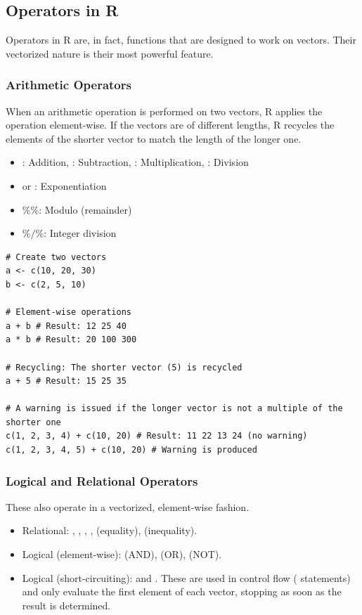 \subsection*{Operators in R}
Operators in R are, in fact, functions that are designed to work on vectors. Their vectorized nature is their most powerful feature.

\subsubsection*{Arithmetic Operators}
When an arithmetic operation is performed on two vectors, R applies the operation element-wise. If the vectors are of different lengths, R recycles the elements of the shorter vector to match the length of the longer one.
\begin{itemize}
    \item \rcode{+}: Addition, \rcode{-}: Subtraction, \rcode{*}: Multiplication, \rcode{/}: Division
    \item \rcode{^} or \rcode{**}: Exponentiation
    \item $\%\%$: Modulo (remainder)
    \item $\%/\%$: Integer division
\end{itemize}

\begin{example}
\text{ }\begin{verbatim}
# Create two vectors
a <- c(10, 20, 30)
b <- c(2, 5, 10)

# Element-wise operations
a + b # Result: 12 25 40
a * b # Result: 20 100 300

# Recycling: The shorter vector (5) is recycled
a + 5 # Result: 15 25 35

# A warning is issued if the longer vector is not a multiple of the shorter one
c(1, 2, 3, 4) + c(10, 20) # Result: 11 22 13 24 (no warning)
c(1, 2, 3, 4, 5) + c(10, 20) # Warning is produced
\end{verbatim}
\end{example}

\subsubsection*{Logical and Relational Operators}
These also operate in a vectorized, element-wise fashion.
\begin{itemize}
    \item Relational: \rcode{<}, \rcode{>}, \rcode{<=}, \rcode{>=}, \rcode{==} (equality), \rcode{!=} (inequality).
    \item Logical (element-wise): \rcode{&} (AND), \rcode{|} (OR), \rcode{!} (NOT).
    \item Logical (short-circuiting): \rcode{&&} and \rcode{||}. These are used in control flow ( statements) and only evaluate the first element of each vector, stopping as soon as the result is determined.
\end{itemize}

